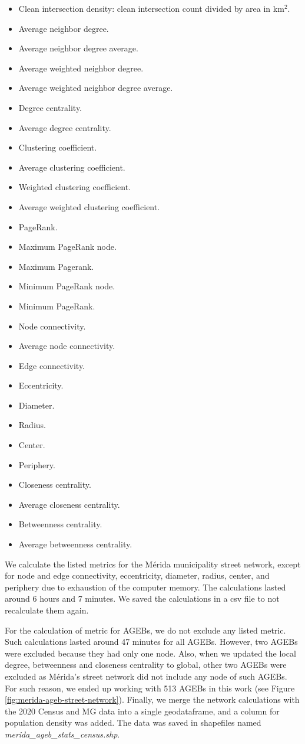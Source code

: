 \begin{itemize}
	\item Clean intersection density: clean intersection count divided by area in km$^2$.
	\item Average neighbor degree.
	\item Average neighbor degree average.
	\item Average weighted neighbor degree.
	\item Average weighted neighbor degree average.
	\item Degree centrality.
	\item Average degree centrality.
	\item Clustering coefficient.
	\item Average clustering coefficient.
	\item Weighted clustering coefficient.
	\item Average weighted clustering coefficient.
	\item PageRank.
	\item Maximum PageRank node.
	\item Maximum Pagerank.
	\item Minimum PageRank node.
	\item Minimum PageRank.
	\item Node connectivity.
	\item Average node connectivity.
	\item Edge connectivity.
	\item Eccentricity.
	\item Diameter.
	\item Radius.
	\item Center.
	\item Periphery.
	\item Closeness centrality.
	\item Average closeness centrality.
	\item Betweenness centrality.
	\item Average betweenness centrality.
\end{itemize}

We calculate the listed metrics for the Mérida municipality street network, except for node and edge connectivity, eccentricity, diameter, radius, center, and periphery due to exhaustion of the computer memory. The calculations lasted around 6 hours and 7 minutes. We saved the calculations in a csv file to not recalculate them again.

For the calculation of metric for AGEBs, we do not exclude any listed metric. Such calculations lasted around 47 minutes for all AGEBs. However, two AGEBs were excluded because they had only one node. Also, when we updated the local degree, betweenness and closeness centrality to global, other two AGEBs were excluded as Mérida's street network did not include any node of such AGEBs. For such reason, we ended up working with 513 AGEBs in this work (see Figure \ref{fig:merida-ageb-street-network}). Finally, we merge the network calculations with the 2020 Census and MG data into a single geodataframe, and a column for population density was added. The data was saved in shapefiles named \textit{merida\_ageb\_stats\_census.shp}.

